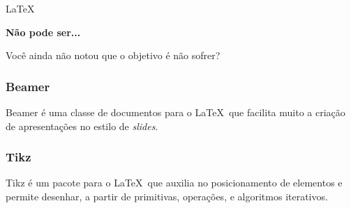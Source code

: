 
\begin{frame}
    \begin{center}
        \Huge \LaTeX
    \end{center}
\end{frame}

\begin{frame}[t]
    \vfill
    \begin{center}
    \color{white} \Huge \textbf{Não pode ser...}
    \end{center}
    \vfill
\end{frame}

\begin{frame}
    \Huge Você ainda não notou que o objetivo é não sofrer?
\end{frame}

\begin{frame}
    \frametitle{Beamer}
    Beamer é uma classe de documentos para o \LaTeX\ que facilita muito
    a criação de apresentações no estilo de \emph{slides}.
\end{frame}

\begin{frame}
    \frametitle{Tikz}

    Tikz é um pacote para o \LaTeX\ que auxilia no posicionamento de elementos
    e permite desenhar, a partir de primitivas, operações, e algoritmos iterativos.    
\end{frame}

